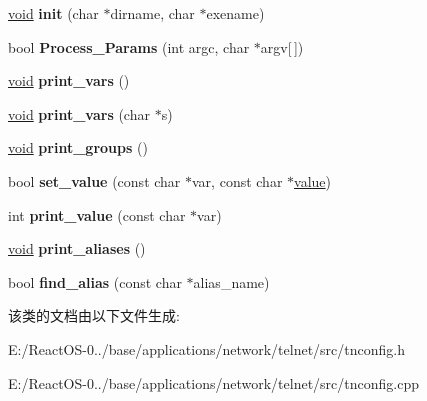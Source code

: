 \begin{DoxyCompactItemize}
\mbox{\label{class_t_config_aac6388257c4574b96da2c52a18b0d377}} 
\hyperlink{interfacevoid}{void} {\bfseries init} (char $\ast$dirname, char $\ast$exename)
\item 
\mbox{\label{class_t_config_a8aa1522f2e4d6636316692fe6e7ba9ae}} 
bool {\bfseries Process\+\_\+\+Params} (int argc, char $\ast$argv\mbox{[}$\,$\mbox{]})
\item 
\mbox{\label{class_t_config_ac5afd96fa973ef3b0351bea2d78bead4}} 
\hyperlink{interfacevoid}{void} {\bfseries print\+\_\+vars} ()
\item 
\mbox{\label{class_t_config_a62ae8a2e46dc1ef400dd374debb1b832}} 
\hyperlink{interfacevoid}{void} {\bfseries print\+\_\+vars} (char $\ast$s)
\item 
\mbox{\label{class_t_config_a0878168894dc5ca9fadbc022dbb79e4b}} 
\hyperlink{interfacevoid}{void} {\bfseries print\+\_\+groups} ()
\item 
\mbox{\label{class_t_config_a39b0d655e6aec6c82452d922b9d5dbab}} 
bool {\bfseries set\+\_\+value} (const char $\ast$var, const char $\ast$\hyperlink{unionvalue}{value})
\item 
\mbox{\label{class_t_config_afbc1a01d5565ef1deac0f155578adb6e}} 
int {\bfseries print\+\_\+value} (const char $\ast$var)
\item 
\mbox{\label{class_t_config_ace37b159300664e5fff1c5062d939ad0}} 
\hyperlink{interfacevoid}{void} {\bfseries print\+\_\+aliases} ()
\item 
\mbox{\label{class_t_config_a9f6dbb9d452cdc52c30a4b3e8d7aafb1}} 
bool {\bfseries find\+\_\+alias} (const char $\ast$alias\+\_\+name)
\end{DoxyCompactItemize}


该类的文档由以下文件生成\+:\begin{DoxyCompactItemize}
\item 
E\+:/\+React\+O\+S-\/0../base/applications/network/telnet/src/tnconfig.\+h\item 
E\+:/\+React\+O\+S-\/0../base/applications/network/telnet/src/tnconfig.\+cpp\end{DoxyCompactItemize}
